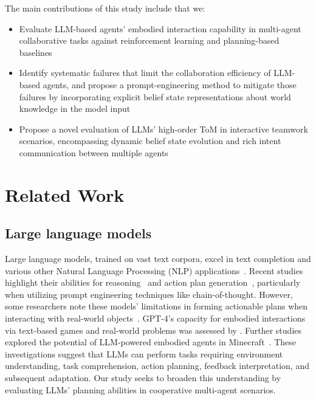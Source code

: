 \documentclass[11pt]{article}
\begin{document}
The main contributions of this study include that we: 
\begin{itemize}
  \item Evaluate LLM-based agents' embodied interaction capability in multi-agent collaborative tasks against reinforcement learning and planning-based baselines
  \item Identify systematic failures that limit the collaboration efficiency of LLM-based agents, and propose a prompt-engineering method to mitigate those failures by incorporating explicit belief state representations about world knowledge in the model input
\item Propose a novel evaluation of LLMs' high-order ToM in interactive teamwork scenarios, encompassing dynamic belief state evolution and rich intent communication between multiple agents
\end{itemize}



\section{Related Work}
\subsection{Large language models}
Large language models, trained on vast text corpora, excel in text completion and various other Natural Language Processing (NLP) applications~\cite{chowdhery2022palm,thoppilan2022lamda}. Recent studies highlight their abilities for reasoning~\cite{bubeck2023sparks,wei2022chain} and action plan generation~\cite{liu2023llm,xie2023translating}, particularly when utilizing prompt engineering techniques like chain-of-thought. However, some researchers note these models' limitations in forming actionable plans when interacting with real-world objects~\cite{ahn2022can,huang2022language}. GPT-4's capacity for embodied interactions via text-based games and real-world problems was assessed by \citet{bubeck2023sparks}. Further studies explored the potential of LLM-powered embodied agents in Minecraft~\cite{wang2023describe,wang2023voyager}. These investigations suggest that LLMs can perform tasks requiring environment understanding, task comprehension, action planning, feedback interpretation, and subsequent adaptation. Our study seeks to broaden this understanding by evaluating LLMs' planning abilities in cooperative multi-agent scenarios.
\end{document}
